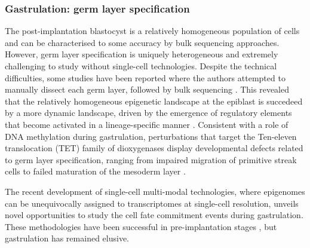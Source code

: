 \subsubsection{Gastrulation: germ layer specification}

The post-implantation blastocyst is a relatively homogeneous population of cells and can be characterised to some accuracy by bulk sequencing approaches. However, germ layer specification is uniquely heterogeneous and extremely challenging to study without single-cell technologies. Despite the technical difficulties, some studies have been reported where the authors attempted to manually dissect each germ layer, followed by bulk sequencing \cite{Zhang2018}. This revealed that the relatively homogeneous epigenetic landscape at the epiblast is succedeed by a more dynamic landscape, driven by the emergence of regulatory elements that become activated in a lineage-specific manner \cite{Zhang2018,Lee2015}. Consistent with a role of DNA methylation during gastrulation, perturbations that target the Ten-eleven translocation (TET) family of dioxygenases display developmental defects related to germ layer specification, ranging from impaired migration of primitive streak cells to failed maturation of the mesoderm layer \cite{Dai2016}.

The recent development of single-cell multi-modal technologies, where epigenomes can be unequivocally assigned to transcriptomes at single-cell resolution, unveils novel opportunities to study the cell fate commitment events during gastrulation. These methodologies have been successful in pre-implantation stages \cite{Guo2017,Wang2019,Liu2019}, but gastrulation has remained elusive.

